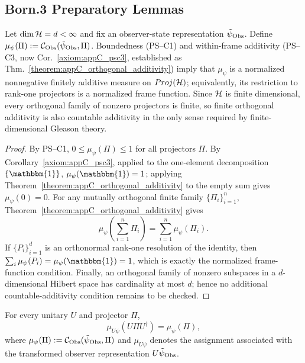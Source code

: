 \subsection{Born.3 Preparatory Lemmas}
\label{subsec:appC_born_lemmas}

\begin{lemma}
\label{lemma:appC_sigma_additivity}
Let $\dim\mathcal{H}=d<\infty$ and fix an observer-state representation
$\tilde\psi_{\mathrm{Obs}}$. Define
$\mu_\psi(\Pi):=\mathcal{C}_{\mathrm{Obs}}(\tilde\psi_{\mathrm{Obs}},\Pi)$.
Boundedness (PS--C1) and within-frame additivity (PS--C3, now
Cor.~\ref{axiom:appC_psc3}, established as
Thm.~\ref{theorem:appC_orthogonal_additivity}) imply that $\mu_\psi$ is a
normalized nonnegative finitely additive measure on $Proj(\mathcal{H})$; equivalently, its restriction to
rank-one projectors is a normalized frame function. Since $\mathcal{H}$ is finite
dimensional, every orthogonal family of nonzero projectors is finite, so finite
orthogonal additivity is also countable additivity in the only sense required by
finite-dimensional Gleason theory.
\end{lemma}

\begin{proof}
\label{proof:appC_sigma_additivity}
By PS--C1, $0\le \mu_\psi(\Pi)\le 1$ for all projectors $\Pi$. By
Corollary~\ref{axiom:appC_psc3}, applied to the one-element decomposition
$\{\mathbbm{1}\}$, $\mu_\psi(\mathbbm{1})=1$; applying
Theorem~\ref{theorem:appC_orthogonal_additivity} to the empty sum gives
$\mu_\psi(0)=0$. For any mutually orthogonal finite family
$\{\Pi_i\}_{i=1}^n$, Theorem~\ref{theorem:appC_orthogonal_additivity} gives
\[
\mu_\psi\!\left(\sum_{i=1}^n \Pi_i\right)=\sum_{i=1}^n \mu_\psi(\Pi_i).
\]
If $\{P_i\}_{i=1}^d$ is an orthonormal rank-one resolution of the identity, then
$\sum_i\mu_\psi(P_i)=\mu_\psi(\mathbbm{1})=1$, which is exactly the normalized
frame-function condition. Finally, an orthogonal family of nonzero subspaces in a
$d$-dimensional Hilbert space has cardinality at most $d$; hence no additional
countable-additivity condition remains to be checked.
\end{proof}

\begin{lemma}
\label{lemma:appC_unitary_invariance}
For every unitary $U$ and projector $\Pi$,
\[
\mu_{U\psi}(U\Pi U^\dagger)=\mu_\psi(\Pi),
\]
where $\mu_\psi(\Pi):=\mathcal{C}_{\mathrm{Obs}}(\tilde\psi_{\mathrm{Obs}},\Pi)$ and
$\mu_{U\psi}$ denotes the assignment associated with the transformed observer
representation $U\tilde\psi_{\mathrm{Obs}}$.
\end{lemma}

